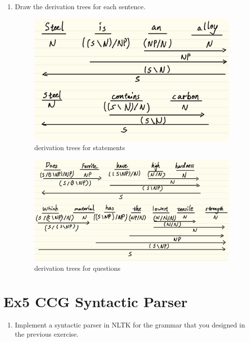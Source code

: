 \documentclass[12pt]{article}
\begin{document}
{\begin{enumerate}[1.]
    strength: N
    \item Draw the derivation trees for each sentence.
    \begin{figure}[ht]
        \centering
        \includegraphics[scale=0.2]{figs/derTree1.jpg}
        \caption{derivation trees for statements}
        \label{label:derivation tree 1}
    \end{figure}
    \begin{figure}[ht]
        \centering
        \includegraphics[scale=0.2]{figs/derTree2.jpg}
        \caption{derivation trees for questions}
        \label{label:derivation tree 2}
    \end{figure}
\end{enumerate}

\section{Ex5 CCG Syntactic Parser}
\label{sec: ex5}
\begin{enumerate}[1.]
    \item Implement a syntactic parser in NLTK for the grammar that you designed in the previous exercise.
    

\end{enumerate}}
\end{document}
